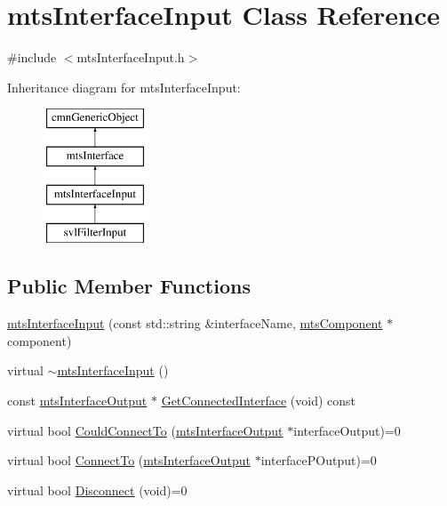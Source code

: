 \hypertarget{classmts_interface_input}{}\section{mts\+Interface\+Input Class Reference}
\label{classmts_interface_input}


{\ttfamily \#include $<$mts\+Interface\+Input.\+h$>$}

Inheritance diagram for mts\+Interface\+Input\+:\begin{figure}[H]
\begin{center}
\leavevmode
\includegraphics[height=4.000000cm]{d0/d17/classmts_interface_input}
\end{center}
\end{figure}
\subsection*{Public Member Functions}
\begin{DoxyCompactItemize}
\item 
\hyperlink{classmts_interface_input_a898d12de2aa9781e5a97d2d379bfd902}{mts\+Interface\+Input} (const std\+::string \&interface\+Name, \hyperlink{classmts_component}{mts\+Component} $\ast$component)
\item 
virtual \hyperlink{classmts_interface_input_a15ccb20eb9a6c17d4b124b178fa891f7}{$\sim$mts\+Interface\+Input} ()
\item 
const \hyperlink{classmts_interface_output}{mts\+Interface\+Output} $\ast$ \hyperlink{classmts_interface_input_a6c6a10b98df1193d52bba32c966d2a97}{Get\+Connected\+Interface} (void) const 
\item 
virtual bool \hyperlink{classmts_interface_input_a4cb4736ed2bdf9f54bc10a459bfbacd7}{Could\+Connect\+To} (\hyperlink{classmts_interface_output}{mts\+Interface\+Output} $\ast$interface\+Output)=0
\item 
virtual bool \hyperlink{classmts_interface_input_ad1b9041d37b0d78b11183e37cefe2a7f}{Connect\+To} (\hyperlink{classmts_interface_output}{mts\+Interface\+Output} $\ast$interface\+P\+Output)=0
\item 
virtual bool \hyperlink{classmts_interface_input_abc4be5ee83eca5ced2ad6e892fa19572}{Disconnect} (void)=0
\end{DoxyCompactItemize}
